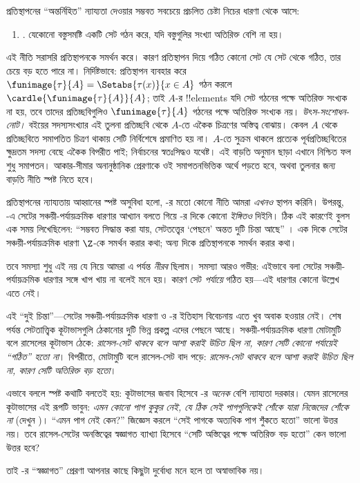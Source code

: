 \documentclass[../../../include/open-logic-section]{subfiles}
\begin{document}

প্রতিস্থাপনের ``অন্তর্নিহিত'' ন্যায্যতা দেওয়ার
সম্ভবত সবচেয়ে প্রচলিত চেষ্টা নিচের ধারণা
থেকে আসে:
\begin{enumerate}
	\item[] \limofsize. যেকোনো বস্তুসমষ্টি একটি
	সেট গঠন করে, যদি বস্তুগুলির সংখ্যা অতিরিক্ত
	বেশি না হয়।
\end{enumerate}
এই নীতি সরাসরি প্রতিস্থাপনকে সমর্থন করে।
কারণ প্রতিস্থাপন দিয়ে গঠিত কোনো সেট
যে সেট থেকে গঠিত, তার চেয়ে বড় হতে পারে না।
নির্দিষ্টভাবে: প্রতিস্থাপন ব্যবহার করে
$\funimage{\tau}{A} = \Setabs{\tau(x)}{x \in A}$
গঠন করলে $\cardle{\funimage{\tau}{A}}{A}$;
তাই $A$-র !!{element}s যদি সেট গঠনের
পক্ষে অতিরিক্ত সংখ্যক না হয়, তবে তাদের
প্রতিচ্ছবিগুলিও $\funimage{\tau}{A}$ গঠনের
পক্ষে অতিরিক্ত সংখ্যক নয়।
\emph{উৎস-সংশোধন-নোট।} বইয়ের সদস্যসংখ্যার এই তুলনা
প্রতিচ্ছবি থেকে $A$-তে একৈক চিত্রণের অস্তিত্ব বোঝায়। কেবল
$A$ থেকে প্রতিচ্ছবিতে সমাপতিত চিত্রণ থাকায় সেটি নির্বিশেষে
প্রমাণিত হয় না। $A$-তে সুক্রম থাকলে প্রত্যেক পূর্বপ্রতিচ্ছবিতের
ক্ষুদ্রতম সদস্য বেছে একৈক বিপরীত পাই; নির্বাচনের স্বতঃসিদ্ধও
যথেষ্ট। এই বাড়তি অনুমান ছাড়া এখানে নিশ্চিত ফল শুধু
সমাপতন। আকার-সীমার অনানুষ্ঠানিক প্রেরণাকে ওই সমাপতনভিত্তিক
অর্থে পড়তে হবে, অথবা তুলনার জন্য বাড়তি নীতি স্পষ্ট নিতে হবে।

প্রতিস্থাপনের ন্যায্যতায় \limofsize{}
আহ্বানের স্পষ্ট অসুবিধা হলো, \limofsize-র
মতো কোনো নীতি আমরা \emph{এখনও}
স্থাপন করিনি। উপরন্তু,
-এ
সেটের সঞ্চয়ী-পর্যায়ক্রমিক ধারণার আখ্যান
বলতে গিয়ে \limofsize-র দিকে কোনো
\emph{ইঙ্গিতও} দিইনি। ঠিক এই কারণেই
বুলস এক সময় লিখেছিলেন: ``সম্ভবত
সিদ্ধান্ত করা যায়, সেটতত্ত্বের ‘পেছনে’
অন্তত দুটি চিন্তা আছে''
\citeyearpar[p.~19]{Boolos1989}।
এক দিকে সেটের সঞ্চয়ী-পর্যায়ক্রমিক
ধারণা $\Z$-কে সমর্থন করার কথা;
অন্য দিকে \limofsize{} প্রতিস্থাপনকে
সমর্থন করার কথা।

তবে সমস্যা শুধু এই নয় যে \limofsize{}
নিয়ে আমরা এ পর্যন্ত \emph{নীরব} ছিলাম।
সমস্যা আরও গভীর: এইভাবে বলা \limofsize{}
সেটের সঞ্চয়ী-পর্যায়ক্রমিক ধারণার সঙ্গে
খাপ খায় না বলেই মনে হয়। কারণ সেট
\emph{পর্যায়ে} গঠিত হয়—এই ধারণার
কোনো উল্লেখ এতে নেই।

এই ``দুই চিন্তা''—সেটের সঞ্চয়ী-পর্যায়ক্রমিক
ধারণা ও \limofsize-র ইতিহাস বিবেচনায়
এতে খুব অবাক হওয়ার নেই। শেষ পর্যন্ত
সেটতাত্ত্বিক কূটাভাসগুলি ঠেকানোর দুটি
ভিন্ন প্রকল্প এদের পেছনে আছে। সঞ্চয়ী-পর্যায়ক্রমিক
ধারণা মোটামুটি বলে রাসেলের কূটাভাস ঠেকে:
\emph{রাসেল-সেট থাকবে বলে আশা করাই উচিত
ছিল না, কারণ সেটি কোনো পর্যায়েই ``গঠিত''
হতো না}। বিপরীতে, \limofsize{} মোটামুটি
বলে রাসেল-সেট বাদ পড়ে: \emph{রাসেল-সেট
থাকবে বলে আশা করাই উচিত ছিল না,
কারণ সেটি অতিরিক্ত বড় হতো}।

এভাবে বললে স্পষ্ট কথাটি বলতেই হয়:
কূটাভাসের জবাব হিসেবে \limofsize-র
\emph{অনেক} বেশি ন্যায্যতা দরকার।
যেমন রাসেলের কূটাভাসের এই রূপটি ভাবুন:
\emph{এমন কোনো পাগ কুকুর নেই, যে ঠিক সেই পাগগুলিকেই
শোঁকে যারা নিজেদের শোঁকে না}
(দেখুন )।
``এমন পাগ নেই কেন?'' জিজ্ঞেস করলে
``সেই পাগকে অত্যধিক পাগ শুঁকতে হতো''
ভালো উত্তর নয়। তবে রাসেল-সেটের
অনস্তিত্বের স্বজ্ঞাগত ব্যাখ্যা হিসেবে
``সেটি অস্তিত্বের পক্ষে অতিরিক্ত বড়
হতো'' কেন ভালো উত্তর হবে?

তাই \limofsize-র ``স্বজ্ঞাগত'' প্রেরণা
আপনার কাছে কিছুটা দুর্বোধ্য মনে হলে
তা অস্বাভাবিক নয়।
\end{document}
